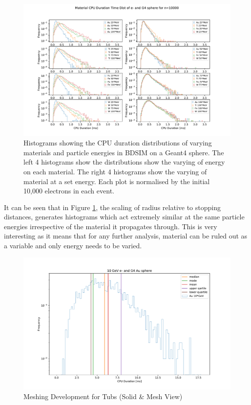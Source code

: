 \documentclass[12pt,a4paper]{article}
\begin{document}
\begin{figure}[h!]
\centering
\includegraphics[scale=0.6]{Images//Materials//Varied_by_radius_and_secondaries.pdf}
\caption[width=\columnwidth]{Histograms showing the CPU duration distributions of varying materials and particle energies in BDSIM on a Geant4 sphere. The left 4 histograms show the distributions show the varying of energy on each material. The right 4 histograms show the varying of material at a set energy. Each plot is normalised by the initial 10,000 electrons in each event.}
\label{var}
\end{figure}

\noindent It can be seen that in Figure \ref{var}, the scaling of radius relative to stopping distances, generates histograms which act extremely similar at the same particle energies irrespective of the material it propagates through. This is very interesting as it means that for any further analysis, material can be ruled out as a variable and only energy needs to be varied.

\begin{figure}[h!]
\centering
\includegraphics[scale=0.4]{Images//Materials//Time_ex_dists.pdf}
\caption[width=\columnwidth]{Meshing Development for Tubs (Solid \& Mesh View)}
\label{tubspic}
\end{figure}
\end{document}
